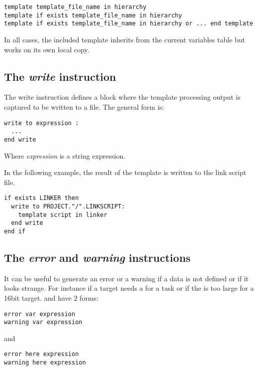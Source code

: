 \begin{lstlisting}
template template_file_name in hierarchy
template if exists template_file_name in hierarchy
template if exists template_file_name in hierarchy or ... end template
\end{lstlisting}


In all cases, the included template inherits from the current variables table but works on its own local copy.

\subsection{The {\em write} instruction}

The write instruction defines a block where the template processing output is captured to be written to a file. The general form is:

\begin{lstlisting}
write to expression :
  ...
end write
\end{lstlisting}

Where {\em expression} is a string expression.

In the following example, the result of the  template is written to the link script file.

\begin{lstlisting}
if exists LINKER then
  write to PROJECT."/".LINKSCRIPT:
    template script in linker
  end write
end if
\end{lstlisting}


\subsection{The {\em error} and {\em warning} instructions}

It can be useful to generate an error or a warning if a data is not defined or if it looks strange. For instance if a target needs a  for a task or if the  is too large for a 16bit target.  and  have 2 forms:

\begin{lstlisting}
error var expression
warning var expression
\end{lstlisting}

and

\begin{lstlisting}
error here expression
warning here expression
\end{lstlisting}

